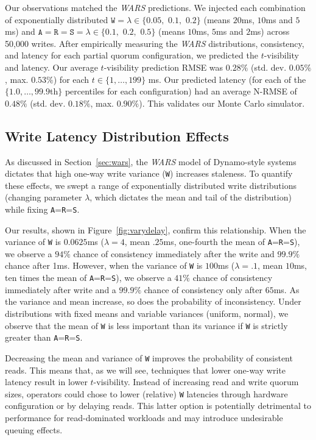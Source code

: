 \documentclass{vldb}
\newcommand{\subsectionskip}{-0em}
\begin{document}
Our observations matched the \textit{WARS} predictions. We injected
each combination of exponentially distributed $\texttt{W}=\lambda \in
\{0.05,$ $0.1,$ $0.2\}$ (means $20$ms, $10$ms and $5$ms)
and $\texttt{A}$$=$$\texttt{R}$$=$$\texttt{S}=\lambda \in \{0.1,$
$0.2,$ $0.5\}$ (means $10$ms, $5$ms and $2$ms) across
50,000 writes.  After empirically measuring the \textit{WARS}
distributions, consistency, and latency for each partial quorum
configuration, we predicted the $t$-visibility and latency. Our
average $t$-visibility prediction RMSE was $0.28\%$
(std. dev. $0.05\%$, max. $0.53\%$) for each
$t\in$$\{1,$$\dots,$$199\}$ ms. Our predicted latency (for each of the
$\{1.0, \dots, 99.9$th$\}$ percentiles for each configuration) had an
average N-RMSE of $0.48\%$ (std. dev. $0.18\%$, max. $0.90\%$).  This
validates our Monte Carlo simulator.


\vspace{\subsectionskip}\subsection{Write Latency Distribution Effects}
\label{sec:synthetic}

As discussed in Section~\ref{sec:wars}, the \textit{WARS} model of
Dynamo-style systems dictates that high one-way write variance
(\texttt{W}) increases staleness.  To quantify these effects, we swept
a range of exponentially distributed write distributions (changing
parameter $\lambda$, which dictates the mean and tail of the
distribution) while fixing \texttt{A}=\texttt{R}=\texttt{S}.

Our results, shown in Figure~\ref{fig:varydelay}, confirm this
relationship.  When the variance of \texttt{W} is $0.0625$ms
($\lambda=4$, mean $.25$ms, one-fourth the mean of
\texttt{A}=\texttt{R}=\texttt{S}), we observe a $94\%$ chance of
consistency immediately after the write and $99.9\%$ chance after 1ms.
However, when the variance of \texttt{W} is $100$ms ($\lambda=.1$,
mean $10$ms, ten times the mean of \texttt{A}=\texttt{R}=\texttt{S}),
we observe a $41\%$ chance of consistency immediately after write and
a $99.9\%$ chance of consistency only after $65$ms.  As the variance
and mean increase, so does the probability of inconsistency.  Under
distributions with fixed means and variable variances (uniform,
normal), we observe that the mean of \texttt{W} is less important than
its variance if \texttt{W} is strictly greater than
\texttt{A}=\texttt{R}=\texttt{S}.

Decreasing the mean and variance of \texttt{W} improves the
probability of consistent reads.  This means that, as we will see,
techniques that lower one-way write latency result in lower
$t$-visibility.  Instead of increasing read and write quorum sizes,
operators could chose to lower (relative) \texttt{W} latencies through
hardware configuration or by delaying reads.  This latter option is
potentially detrimental to performance for read-dominated workloads and
may introduce undesirable queuing effects.
\end{document}
